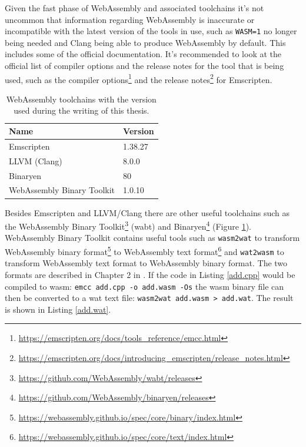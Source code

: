 Given the fast phase of WebAssembly and associated toolchains it's not uncommon that information regarding WebAssembly is inaccurate or incompatible with the latest version of the tools in use, such as \texttt{WASM=1} no longer being needed and Clang being able to produce WebAssembly by default. This includes some of the official documentation. It's recommended to look at the official list of compiler options and the release notes for the tool that is being used, such as the compiler options\footnote{\url{https://emscripten.org/docs/tools_reference/emcc.html}} and the release notes\footnote{\url{https://emscripten.org/docs/introducing_emscripten/release_notes.html}} for Emscripten.

\begin{table}[!h]
\caption{\label{toolchains}WebAssembly toolchains with the version used during the writing of this thesis.}
\centering
\begin{tabular}{ll}
\hline
\textbf{Name} & \textbf{Version} \\ \hline
Emscripten & 1.38.27 \\
LLVM (Clang) & 8.0.0 \\
Binaryen & 80 \\
WebAssembly Binary Toolkit & 1.0.10 \\ \hline
\end{tabular}
\end{table}
    
Besides Emscripten and LLVM/Clang there are other useful toolchains such as the WebAssembly Binary Toolkit\footnote{\url{https://github.com/WebAssembly/wabt/releases}} (wabt) and Binaryen\footnote{\url{https://github.com/WebAssembly/binaryen/releases}} (Figure \ref{toolchains}). WebAssembly Binary Toolkit contains useful tools such as \texttt{wasm2wat} to transform WebAssembly binary format\footnote{\url{https://webassembly.github.io/spec/core/binary/index.html}} to WebAssembly text format\footnote{\url{https://webassembly.github.io/spec/core/text/index.html}} and \texttt{wat2wasm} to transform WebAssembly text format to WebAssembly binary format. The two formats are described in Chapter 2 in \textcite{Rourke2018}. If the code in Listing \ref{add.cpp} would be compiled to wasm: \texttt{emcc add.cpp -o add.wasm -Os} the wasm binary file can then be converted to a wat text file: \texttt{wasm2wat add.wasm > add.wat}. The result is shown in Listing \ref{add.wat}.



